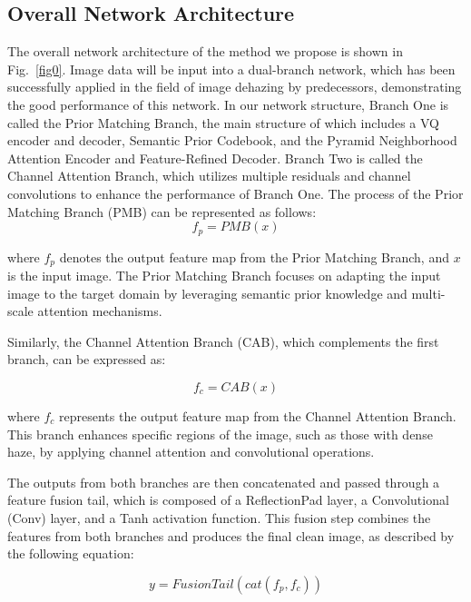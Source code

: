 \documentclass[journal]{IEEEtran}
\begin{document}
\subsection{Overall Network Architecture}
The overall network architecture of the method we propose is shown in Fig.~\ref{fig0}. Image data will be input into a dual-branch network, which has been successfully applied in the field of image dehazing by predecessors, demonstrating the good performance of this network. In our network structure, Branch One is called the Prior Matching Branch, the main structure of which includes a VQ encoder and decoder, Semantic Prior Codebook, and the Pyramid Neighborhood Attention Encoder and Feature-Refined Decoder. Branch Two is called the Channel Attention Branch, which utilizes multiple residuals and channel convolutions to enhance the performance of Branch One. The process of the Prior Matching Branch (PMB) can be represented as follows:
\begin{equation}
	\label{PMB}
	f_{p} = PMB(x)
\end{equation}

where $f_{p}$ denotes the output feature map from the Prior Matching Branch, and $x$ is the input image. The Prior Matching Branch focuses on adapting the input image to the target domain by leveraging semantic prior knowledge and multi-scale attention mechanisms.

Similarly, the Channel Attention Branch (CAB), which complements the first branch, can be expressed as:

\begin{equation}
	\label{CAB}
	f_{c} = CAB(x)
\end{equation}

where $f_{c}$ represents the output feature map from the Channel Attention Branch. This branch enhances specific regions of the image, such as those with dense haze, by applying channel attention and convolutional operations.

The outputs from both branches are then concatenated and passed through a feature fusion tail, which is composed of a ReflectionPad layer, a Convolutional (Conv) layer, and a Tanh activation function. This fusion step combines the features from both branches and produces the final clean image, as described by the following equation:

\begin{equation}
	\label{tail}
	y = FusionTail(cat(f_{p}, f_{c}))
\end{equation}
\end{document}

